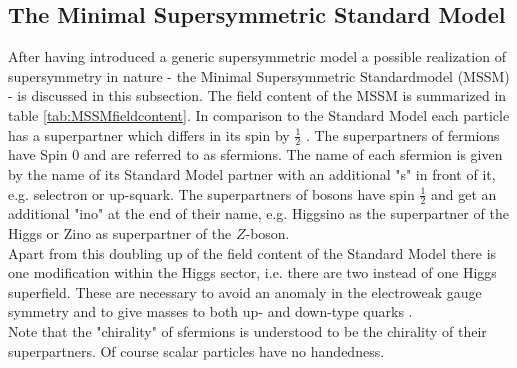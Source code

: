 \subsection{The Minimal Supersymmetric Standard Model}
After having introduced a generic supersymmetric model a possible realization of supersymmetry in nature - the Minimal Supersymmetric Standardmodel (MSSM) - is discussed in this subsection. 
The field content of the MSSM is summarized in table \ref{tab:MSSMfieldcontent}. In comparison to the Standard Model each particle has a superpartner which differs in its spin by $\frac{1}{2}$ . The superpartners of fermions have Spin 0 and are referred to as sfermions. The name of each sfermion is given by the name of its Standard Model partner with an additional "s" in front of it, e.g. selectron or up-squark. The superpartners of bosons have spin $\frac{1}{2}$ and get an additional "ino" at the end of their name, e.g. Higgsino as the superpartner of the Higgs or Zino as superpartner of the $Z$-boson.\\
Apart from this doubling up of the field content of the Standard Model there is one modification within the Higgs sector, i.e. there are two instead of one Higgs superfield. These are necessary to avoid an anomaly in the electroweak gauge symmetry and to give masses to both up- and down-type quarks \cite[page 8]{Martin:1997ns}.\\
Note that the "chirality" of sfermions is understood to be the chirality of their superpartners. Of course scalar particles have no handedness.
